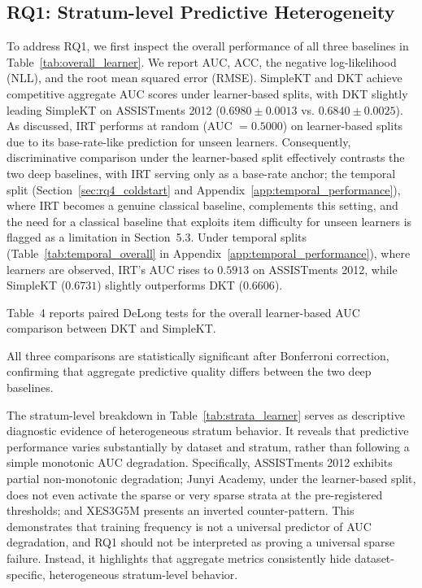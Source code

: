 \subsection{RQ1: Stratum-level Predictive Heterogeneity}
To address RQ1, we first inspect the overall performance of all three baselines in Table~\ref{tab:overall_learner}. We report AUC, ACC, the negative log-likelihood (NLL), and the root mean squared error (RMSE). SimpleKT and DKT achieve competitive aggregate AUC scores under learner-based splits, with DKT slightly leading SimpleKT on ASSISTments 2012 ($0.6980 \pm 0.0013$ vs. $0.6840 \pm 0.0025$). As discussed, IRT performs at random (AUC $= 0.5000$) on learner-based splits due to its base-rate-like prediction for unseen learners. Consequently, discriminative comparison under the learner-based split effectively contrasts the two deep baselines, with IRT serving only as a base-rate anchor; the temporal split (Section~\ref{sec:rq4_coldstart} and Appendix~\ref{app:temporal_performance}), where IRT becomes a genuine classical baseline, complements this setting, and the need for a classical baseline that exploits item difficulty for unseen learners is flagged as a limitation in Section~5.3. Under temporal splits (Table~\ref{tab:temporal_overall} in Appendix~\ref{app:temporal_performance}), where learners are observed, IRT's AUC rises to $0.5913$ on ASSISTments 2012, while SimpleKT ($0.6731$) slightly outperforms DKT ($0.6606$).





Table~4 reports paired DeLong tests for the overall learner-based AUC comparison between DKT and SimpleKT.

All three comparisons are statistically significant after Bonferroni correction, confirming that aggregate predictive quality differs between the two deep baselines.

The stratum-level breakdown in Table~\ref{tab:strata_learner} serves as descriptive diagnostic evidence of heterogeneous stratum behavior. It reveals that predictive performance varies substantially by dataset and stratum, rather than following a simple monotonic AUC degradation. Specifically, ASSISTments 2012 exhibits partial non-monotonic degradation; Junyi Academy, under the learner-based split, does not even activate the sparse or very sparse strata at the pre-registered thresholds; and XES3G5M presents an inverted counter-pattern. This demonstrates that training frequency is not a universal predictor of AUC degradation, and RQ1 should not be interpreted as proving a universal sparse failure. Instead, it highlights that aggregate metrics consistently hide dataset-specific, heterogeneous stratum-level behavior.

